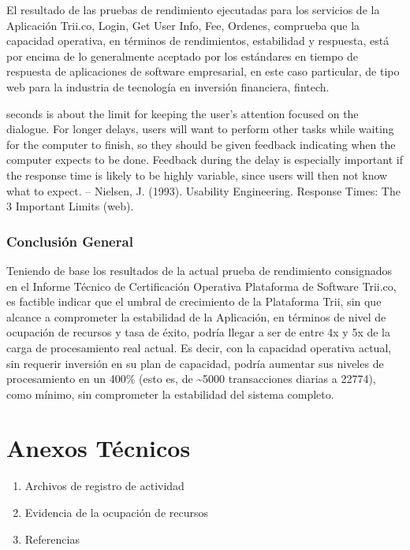 \documentclass[
  paper=a4,
  ,captions=tableheading
]{scrartcl}
\providecommand{\tightlist}{%
  \setlength{\itemsep}{0pt}\setlength{\parskip}{0pt}}
\renewenvironment{quote}{\begin{customblockquote}\list{}{\rightmargin=0em\leftmargin=0em}%
\item\relax\color{blockquote-text}\ignorespaces}{\unskip\unskip\endlist\end{customblockquote}}
\begin{document}
El resultado de las pruebas de rendimiento ejecutadas para los servicios
de la Aplicación Trii.co, Login, Get User Info, Fee, Ordenes, comprueba
que la capacidad operativa, en términos de rendimientos, estabilidad y
respuesta, está por encima de lo generalmente aceptado por los
estándares en tiempo de respuesta de aplicaciones de software
empresarial, en este caso particular, de tipo web para la industria de
tecnología en inversión financiera, fintech.

\begin{quote}
10 seconds is about the limit for keeping the user's attention focused
on the dialogue. For longer delays, users will want to perform other
tasks while waiting for the computer to finish, so they should be given
feedback indicating when the computer expects to be done. Feedback
during the delay is especially important if the response time is likely
to be highly variable, since users will then not know what to expect. --
Nielsen, J. (1993). Usability Engineering. Response Times: The 3
Important Limits (web).
\end{quote}

\subsubsection{Conclusión General}\label{sec:conclusiuxf3n-general}

Teniendo de base los resultados de la actual prueba de rendimiento
consignados en el Informe Técnico de Certificación Operativa Plataforma
de Software Trii.co, es factible indicar que el umbral de crecimiento de
la Plataforma Trii, sin que alcance a comprometer la estabilidad de la
Aplicación, en términos de nivel de ocupación de recursos y tasa de
éxito, podría llegar a ser de entre 4x y 5x de la carga de procesamiento
real actual. Es decir, con la capacidad operativa actual, sin requerir
inversión en su plan de capacidad, podría aumentar sus niveles de
procesamiento en un 400\% (esto es, de \textasciitilde5000 transacciones
diarias a 22774), como mínimo, sin comprometer la estabilidad del
sistema completo.

\newpage

\section{Anexos Técnicos}\label{sec:anexos-tuxe9cnicos}

\begin{enumerate}
\def\labelenumi{\arabic{enumi}.}
\tightlist
\item
  Archivos de registro de actividad
\item
  Evidencia de la ocupación de recursos
\item
  Referencias
\end{enumerate}
\end{document}
